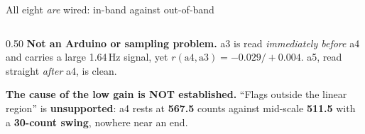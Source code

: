 \documentclass[aspectratio=169]{beamer}
\begin{document}
\begin{frame}{All eight \emph{are} wired: in-band against out-of-band}
\begin{columns}[T]
\begin{column}{0.50\textwidth}
      \vspace{1.5mm}
      \textbf{Not an Arduino or sampling problem.} a3 is read
      \emph{immediately before} a4 and carries a large 1.64\,Hz signal, yet
      $r(\mathrm{a4},\mathrm{a3}) = -0.029 / +0.004$. a5, read straight
      \emph{after} a4, is clean.

      \vspace{1.5mm}
      \alert{\textbf{The cause of the low gain is NOT established.}} ``Flags
      outside the linear region'' is \textbf{unsupported}: a4 rests at
      \textbf{567.5} counts against mid-scale \textbf{511.5} with a
      \textbf{30-count swing}, nowhere near an end.
    \end{column}
  \end{columns}
\end{frame}
\end{document}
